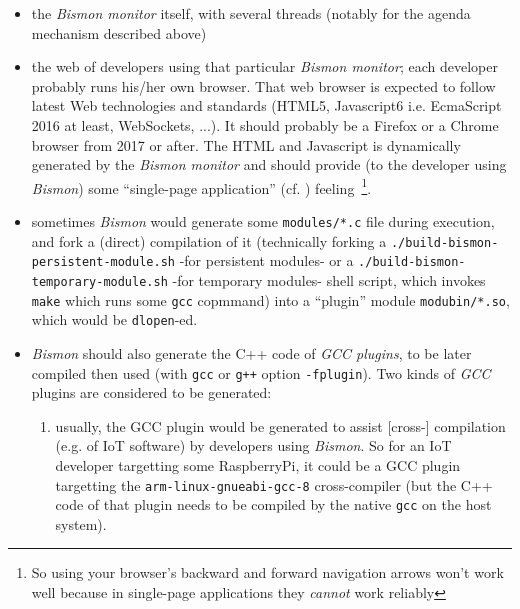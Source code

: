 \begin{itemize}
\item the \emph{Bismon monitor} itself, with several threads (notably for the agenda mechanism described above)
  
  \item the web  of developers using that
    particular \emph{Bismon monitor}; each developer probably runs
    his/her own browser. That web browser is expected to follow latest
    Web technologies and standards (HTML5, Javascript6 i.e. EcmaScript
    2016 at least, WebSockets, ...). It should probably be a Firefox
    or a Chrome browser from 2017 or after. The HTML and Javascript is
    dynamically generated by the \emph{Bismon monitor} and should
    provide (to the developer using \emph{Bismon}) some ``single-page
    application'' (cf. \cite{Atkinson:2018:webtabs,
      Queinnec:2004:ContinWeb, Graunke:2003:ModelingWeb})
    feeling~\footnote{So using your browser's backward and forward
      navigation arrows won't work well because in single-page
      applications they \emph{cannot} work reliably}.

  \item sometimes \emph{Bismon} would generate some
    \texttt{modules/*.c} file during execution, and fork a (direct)
    compilation of it (technically forking a
    \texttt{./build-bismon-persistent-module.sh} -for persistent
    modules- or a \texttt{./build-bismon-temporary-module.sh} -for
    temporary modules- shell script, which invokes \texttt{make} which
    runs some \texttt{gcc} copmmand) into a ``plugin'' module
    \texttt{modubin/*.so}, which would be \texttt{dlopen}-ed.

  \item \emph{Bismon} should also generate the C++ code of \emph{GCC
    plugins}, to be later compiled then used (with \texttt{gcc} or
    \texttt{g++} option \texttt{-fplugin}). Two kinds of \emph{GCC}
    plugins are considered to be generated:

    \begin{enumerate}
      \item usually, the GCC plugin would be generated to assist
        [cross-] compilation (e.g. of IoT software) by developers
        using \emph{Bismon}. So for an IoT developer targetting some
        RaspberryPi, it could be a GCC plugin targetting the
        \texttt{arm-linux-gnueabi-gcc-8} cross-compiler (but the C++
        code of that plugin needs to be compiled by the native
        \texttt{gcc} on the host system).
        

\end{enumerate}
\end{itemize}
